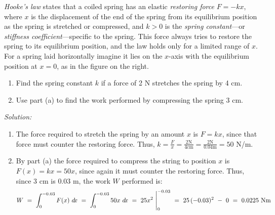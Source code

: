 \begin{exmp}
\noindent \emph{Hooke's law} states that a coiled spring has
an elastic \emph{restoring force} $F=-kx$, where $x$ is the displacement of the
end of the spring from its equilibrium position as the spring is stretched or
compressed, and $k>0$ is the \emph{spring constant}---or
\emph{stiffness coefficient}---specific to the spring. This force always tries
to restore the spring to its equilibrium position, and the law holds only for a
limited range of $x$. For a spring laid horizontally imagine it lies on the
$x$-axis with the equilibrium position at $x=0$, as in the figure on the right.
\begin{enumerate}[\bfseries (a)]
\itemsep0em
\item Find the spring constant $k$ if a force of 2 N stretches the spring by
4 cm.
\item Use part (a) to find the work performed by compressing the spring 3 cm.
\end{enumerate}


\par\noindent\emph{Solution:}
\begin{enumerate}[\bfseries (a)]
\itemsep0em
\item The force required to stretch the spring by an
amount $x$ is $F=kx$, since that force must counter the restoring force. Thus,
$k=\frac{F}{x}=\frac{2 \text{N}}{4 \text{cm}}=\frac{2 \text{N}}{0.04 \text{m}}=
50$ N/m.
\item By part (a) the force required to compress the string to position $x$ is
$F(x)=kx=50x$, since again it must counter the restoring force. Thus, since
$3$ cm is $0.03$ m, the work $W$ performed is:
{
  \setlength{\abovedisplayskip}{0.3em}
  \setlength{\belowdisplayskip}{0em}
\[
W ~=~ \int_0^{-0.03} F(x)~d\!x ~=~ \int_0^{-0.03} 50x~d\!x ~=~ 25x^2~\Biggr|_0^{-0.03}
~=~ 25\,(-0.03)^2 ~-~ 0 ~=~ 0.0225~\text{Nm}
\]
}
\end{enumerate}
\end{exmp}
\divider
\newpage
{}\\

